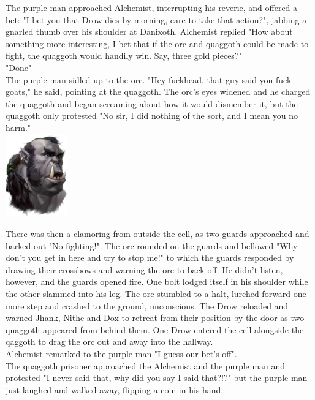 \documentclass[letterpaper,10pt,twoside,twocolumn,openany]{book}
\begin{document}
The purple man approached Alchemist, interrupting his reverie, and offered a bet: "I bet you that Drow dies by morning, care to take that action?", jabbing a gnarled thumb over his shoulder at Danixoth. Alchemist replied "How about something more interesting, I bet that if the orc and quaggoth could be made to fight, the quaggoth would handily win. Say, three gold pieces?"\\
"Done"\\

The purple man sidled up to the orc. "Hey fuckhead, that guy said you fuck goats," he said, pointing at the quaggoth. The orc's eyes widened and he charged the quaggoth and began screaming about how it would dismember it, but the quaggoth only protested "No sir, I did nothing of the sort, and I mean you no harm."\\
{
	\centering
	\includegraphics[width=0.2\textwidth]{img/dist/orc-prisoner.png}
}

There was then a clamoring from outside the cell, as two guards approached and barked out "No fighting!". The orc rounded on the guards and bellowed "Why don't you get in here and try to stop me!" to which the guards responded by drawing their crossbows and warning the orc to back off. He didn't listen, however, and the guards opened fire. One bolt lodged itself in his shoulder while the other slammed into his leg. The orc stumbled to a halt, lurched forward one more step and crashed to the	 ground, unconscious. The Drow reloaded and warned Jhank, Nithe and Dox to retreat from their position by the door as two quaggoth appeared from behind them. One Drow entered the cell alongside the qaggoth to drag the orc out and away into the hallway.\\

Alchemist remarked to the purple man "I guess our bet's off".\\

The quaggoth prisoner approached the Alchemist and the purple man and protested "I never said that, why did you say I said that?!?" but the purple man just laughed and walked away, flipping a coin in his hand.\\
\end{document}
